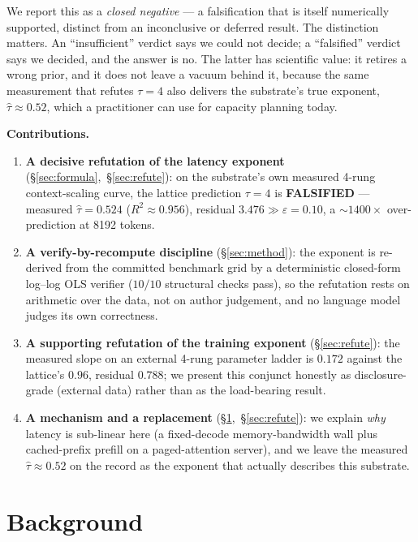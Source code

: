 \documentclass[11pt,a4paper]{article}
\newcommand{\red}[1]{\textcolor{red!70!black}{\textbf{#1}}}
\newcommand{\taum}{\ensuremath{\hat{\tau}}}
\begin{document}
We report this as a \emph{closed negative} --- a falsification that is itself
numerically supported, distinct from an inconclusive or deferred result. The
distinction matters. An ``insufficient'' verdict says we could not decide; a
``falsified'' verdict says we decided, and the answer is no. The latter has
scientific value: it retires a wrong prior, and it does not leave a vacuum
behind it, because the same measurement that refutes \(\tau = 4\) also delivers
the substrate's true exponent, \(\taum \approx 0.52\), which a practitioner can
use for capacity planning today.

\medskip
\noindent\textbf{Contributions.}
\begin{enumerate}\itemsep0.3em
\item \textbf{A decisive refutation of the latency exponent}
  (\S\ref{sec:formula},~\S\ref{sec:refute}): on the substrate's own measured
  4-rung context-scaling curve, the lattice prediction \(\tau = 4\) is
  \red{FALSIFIED} --- measured \(\taum = 0.524\) (\(R^2 \approx 0.956\)),
  residual \(3.476 \gg \varepsilon = 0.10\), a \(\sim\!1400\times\)
  over-prediction at \num{8192} tokens.
\item \textbf{A verify-by-recompute discipline} (\S\ref{sec:method}): the
  exponent is re-derived from the committed benchmark grid by a deterministic
  closed-form log--log OLS verifier (\(10/10\) structural checks pass), so the
  refutation rests on arithmetic over the data, not on author judgement, and no
  language model judges its own correctness.
\item \textbf{A supporting refutation of the training exponent}
  (\S\ref{sec:refute}): the measured slope on an external 4-rung parameter
  ladder is \(0.172\) against the lattice's \(0.96\), residual \(0.788\); we
  present this conjunct honestly as disclosure-grade (external data) rather than
  as the load-bearing result.
\item \textbf{A mechanism and a replacement} (\S\ref{sec:bg},~\S\ref{sec:refute}):
  we explain \emph{why} latency is sub-linear here (a fixed-decode
  memory-bandwidth wall plus cached-prefix prefill on a paged-attention
  server), and we leave the measured \(\taum \approx 0.52\) on the record as
  the exponent that actually describes this substrate.
\end{enumerate}

\section{Background}
\label{sec:bg}
\end{document}
